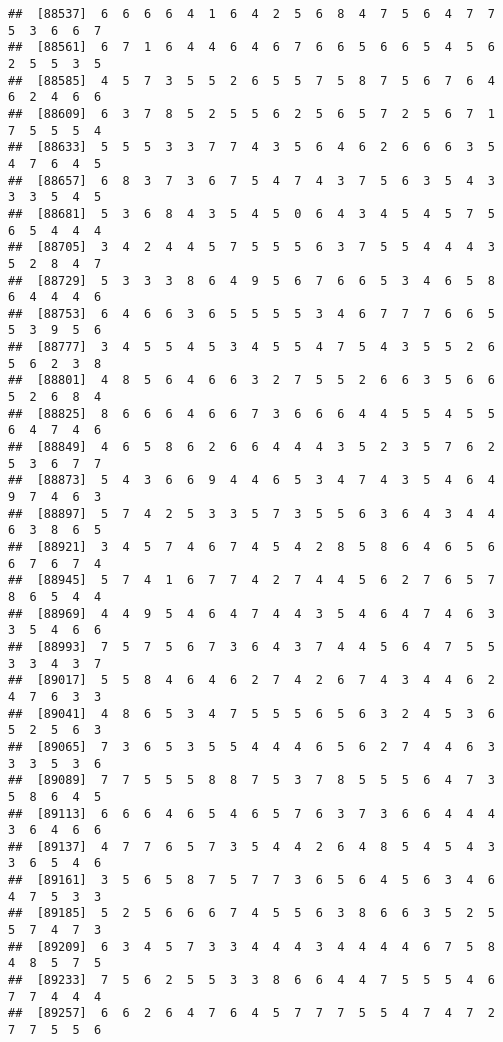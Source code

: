\documentclass[
]{book}
\begin{document}
\begin{verbatim}
##  [88537]  6  6  6  6  4  1  6  4  2  5  6  8  4  7  5  6  4  7  7  5  3  6  6  7
##  [88561]  6  7  1  6  4  4  6  4  6  7  6  6  5  6  6  5  4  5  6  2  5  5  3  5
##  [88585]  4  5  7  3  5  5  2  6  5  5  7  5  8  7  5  6  7  6  4  6  2  4  6  6
##  [88609]  6  3  7  8  5  2  5  5  6  2  5  6  5  7  2  5  6  7  1  7  5  5  5  4
##  [88633]  5  5  5  3  3  7  7  4  3  5  6  4  6  2  6  6  6  3  5  4  7  6  4  5
##  [88657]  6  8  3  7  3  6  7  5  4  7  4  3  7  5  6  3  5  4  3  3  3  5  4  5
##  [88681]  5  3  6  8  4  3  5  4  5  0  6  4  3  4  5  4  5  7  5  6  5  4  4  4
##  [88705]  3  4  2  4  4  5  7  5  5  5  6  3  7  5  5  4  4  4  3  5  2  8  4  7
##  [88729]  5  3  3  3  8  6  4  9  5  6  7  6  6  5  3  4  6  5  8  6  4  4  4  6
##  [88753]  6  4  6  6  3  6  5  5  5  5  3  4  6  7  7  7  6  6  5  5  3  9  5  6
##  [88777]  3  4  5  5  4  5  3  4  5  5  4  7  5  4  3  5  5  2  6  5  6  2  3  8
##  [88801]  4  8  5  6  4  6  6  3  2  7  5  5  2  6  6  3  5  6  6  5  2  6  8  4
##  [88825]  8  6  6  6  4  6  6  7  3  6  6  6  4  4  5  5  4  5  5  6  4  7  4  6
##  [88849]  4  6  5  8  6  2  6  6  4  4  4  3  5  2  3  5  7  6  2  5  3  6  7  7
##  [88873]  5  4  3  6  6  9  4  4  6  5  3  4  7  4  3  5  4  6  4  9  7  4  6  3
##  [88897]  5  7  4  2  5  3  3  5  7  3  5  5  6  3  6  4  3  4  4  6  3  8  6  5
##  [88921]  3  4  5  7  4  6  7  4  5  4  2  8  5  8  6  4  6  5  6  6  7  6  7  4
##  [88945]  5  7  4  1  6  7  7  4  2  7  4  4  5  6  2  7  6  5  7  8  6  5  4  4
##  [88969]  4  4  9  5  4  6  4  7  4  4  3  5  4  6  4  7  4  6  3  3  5  4  6  6
##  [88993]  7  5  7  5  6  7  3  6  4  3  7  4  4  5  6  4  7  5  5  3  3  4  3  7
##  [89017]  5  5  8  4  6  4  6  2  7  4  2  6  7  4  3  4  4  6  2  4  7  6  3  3
##  [89041]  4  8  6  5  3  4  7  5  5  5  6  5  6  3  2  4  5  3  6  5  2  5  6  3
##  [89065]  7  3  6  5  3  5  5  4  4  4  6  5  6  2  7  4  4  6  3  3  3  5  3  6
##  [89089]  7  7  5  5  5  8  8  7  5  3  7  8  5  5  5  6  4  7  3  5  8  6  4  5
##  [89113]  6  6  6  4  6  5  4  6  5  7  6  3  7  3  6  6  4  4  4  3  6  4  6  6
##  [89137]  4  7  7  6  5  7  3  5  4  4  2  6  4  8  5  4  5  4  3  3  6  5  4  6
##  [89161]  3  5  6  5  8  7  5  7  7  3  6  5  6  4  5  6  3  4  6  4  7  5  3  3
##  [89185]  5  2  5  6  6  6  7  4  5  5  6  3  8  6  6  3  5  2  5  5  7  4  7  3
##  [89209]  6  3  4  5  7  3  3  4  4  4  3  4  4  4  4  6  7  5  8  4  8  5  7  5
##  [89233]  7  5  6  2  5  5  3  3  8  6  6  4  4  7  5  5  5  4  6  7  7  4  4  4
##  [89257]  6  6  2  6  4  7  6  4  5  7  7  7  5  5  4  7  4  7  2  7  7  5  5  6

\end{verbatim}
\end{document}
